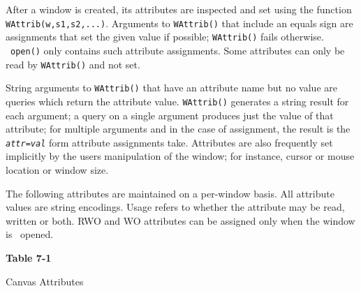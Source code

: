 
After a window is created, its attributes are inspected and set using
the function \texttt{WAttrib(w,s1,s2,...)}. Arguments to
\texttt{WAttrib()} that include an equals sign are assignments that set
the given value if possible; \texttt{WAttrib()} fails otherwise.
\ \texttt{open()} only contains such attribute assignments. Some
attributes can only be read by \texttt{WAttrib()} and not set.

String arguments to \texttt{WAttrib()} that have an attribute name but
no value are queries which return the attribute value.
\texttt{WAttrib()} generates a string result for each argument; a query
on a single argument produces just the value of that attribute; for
multiple arguments and in the case of assignment, the result is the
\texttt{\textit{attr}}\texttt{=}\texttt{\textit{val}} form attribute
assignments take. Attributes are also frequently set implicitly by
the user{\textquotesingle}s manipulation of the window; for instance,
cursor or mouse location or window size.

The following attributes are maintained on a per-window basis. All
attribute values are string encodings. Usage refers to whether the
attribute may be read, written or both. RWO and WO attributes can be
assigned only when the window is \ opened.

\bigskip

{\centering\sffamily\bfseries
Table 7-1

Canvas Attributes
}

